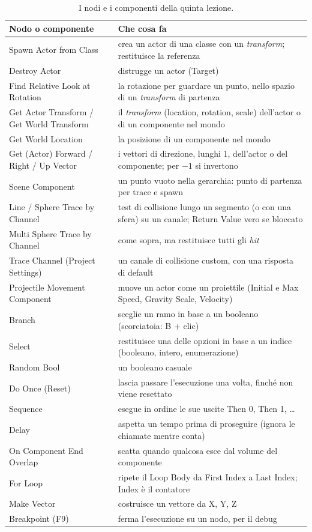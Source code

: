 \begin{table}[htbp]
\centering
\small
\begin{tabular}{@{}p{4.2cm}p{9.8cm}@{}}
\toprule
\textbf{Nodo o componente} & \textbf{Che cosa fa} \\
\midrule
Spawn Actor from Class & crea un actor di una classe con un \emph{transform}; restituisce
la referenza \\
Destroy Actor & distrugge un actor (Target) \\
Find Relative Look at Rotation & la rotazione per guardare un punto, nello spazio di un
\emph{transform} di partenza \\
Get Actor Transform / Get World Transform & il \emph{transform} (location, rotation,
scale) dell'actor o di un componente nel mondo \\
Get World Location & la posizione di un componente nel mondo \\
Get (Actor) Forward / Right / Up Vector & i vettori di direzione, lunghi 1, dell'actor o
del componente; per $-1$ si invertono \\
Scene Component & un punto vuoto nella gerarchia: punto di partenza per trace e spawn \\
Line / Sphere Trace by Channel & test di collisione lungo un segmento (o con una sfera)
su un canale; Return Value vero se bloccato \\
Multi Sphere Trace by Channel & come sopra, ma restituisce tutti gli \emph{hit} \\
Trace Channel (Project Settings) & un canale di collisione custom, con una risposta di
default \\
Projectile Movement Component & muove un actor come un proiettile (Initial e Max
Speed, Gravity Scale, Velocity) \\
Branch & sceglie un ramo in base a un booleano (scorciatoia: B + clic) \\
Select & restituisce una delle opzioni in base a un indice (booleano, intero,
enumerazione) \\
Random Bool & un booleano casuale \\
Do Once (Reset) & lascia passare l'esecuzione una volta, finché non viene resettato \\
Sequence & esegue in ordine le sue uscite Then 0, Then 1, \ldots \\
Delay & aspetta un tempo prima di proseguire (ignora le chiamate mentre conta) \\
On Component End Overlap & scatta quando qualcosa esce dal volume del componente \\
For Loop & ripete il Loop Body da First Index a Last Index; Index è il contatore \\
Make Vector & costruisce un vettore da X, Y, Z \\
Breakpoint (F9) & ferma l'esecuzione su un nodo, per il debug \\
\bottomrule
\end{tabular}
\caption{I nodi e i componenti della quinta lezione.}
\label{ue5:tab:nodi}
\end{table}

